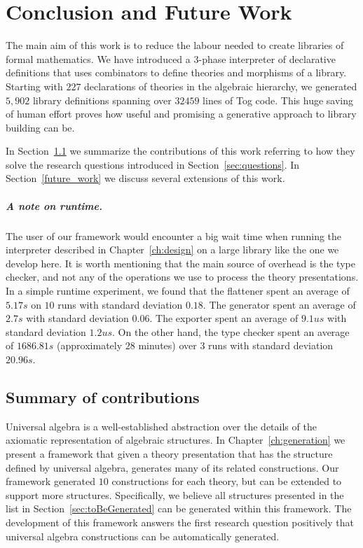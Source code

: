 \chapter{Conclusion and Future Work}
\label{ch:conclusion}

The main aim of this work is to reduce the labour needed to create libraries of formal mathematics. We have introduced a $3$-phase interpreter of declarative definitions that uses combinators to define theories and morphisms of a library. Starting with $227$ declarations of theories in the algebraic hierarchy, we generated $5,902$ library definitions spanning over $32459$ lines of Tog code. 
This huge saving of human effort proves how useful and promising a generative approach to library building can be.  

In Section~\ref{conc:summary} we summarize the contributions of this work referring to how they solve the research questions introduced in Section~\ref{sec:questions}. In Section~\ref{future_work} we discuss several extensions of this work. 

\paragraph{A note on runtime.} The user of our framework would encounter a big wait time when running the interpreter described in Chapter~\ref{ch:design} on a large library like the one we develop here. It is worth mentioning that the main source of overhead is the type checker, and not any of the operations we use to process the theory presentations. In a simple runtime experiment, we found that the flattener spent an average of $5.17 s$ on $10$ runs with standard deviation $0.18$. The generator spent an average of $2.7 s$ with standard deviation $0.06$. The exporter spent an average of $9.1 us$ with standard deviation $1.2 us$. On the other hand, the type checker spent an average of $1686.81s$ (approximately $28$ minutes) over $3$ runs with standard deviation $20.96s$.


\section{Summary of contributions}
\label{conc:summary}
Universal algebra is a well-established abstraction over the details of the axiomatic representation of algebraic structures. In Chapter~\ref{ch:generation} we present a framework that given a theory presentation that has the structure defined by universal algebra, generates many of its related constructions. Our framework generated $10$ constructions for each theory, but can be extended to support more structures. Specifically, we believe all structures presented in the list in Section~\ref{sec:toBeGenerated} can be generated within this framework. The development of this framework answers the first research question positively that universal algebra constructions can be automatically generated. 


